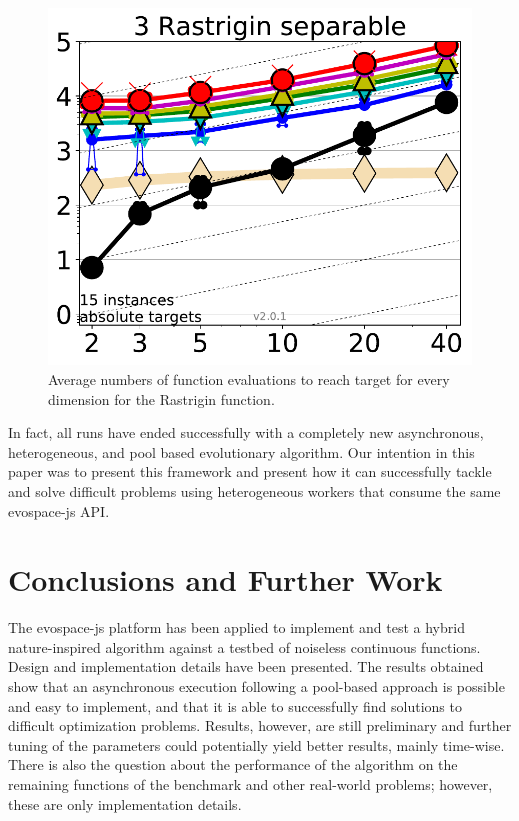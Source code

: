 \begin{figure}[h!tbp]
    \centering
        \includegraphics[width=5in]{img/Rastrigin.pdf}
    \caption{Average numbers of function evaluations to reach target
      for every dimension for the Rastrigin function.}
    \label{fig:rastrigin}
\end{figure}

In fact, all runs have ended successfully with a completely new
asynchronous, heterogeneous, and pool based evolutionary
algorithm. Our intention in this paper was to present this framework
and present how it can successfully tackle and solve difficult
problems using heterogeneous workers that consume the same {\sf
  evospace-js} API. 

\section{Conclusions and Further Work}
\label{sec:conclusions}

The {\sf evospace-js} platform has been applied to implement 
and test a hybrid nature-inspired algorithm against a testbed 
of noiseless continuous functions. Design and implementation 
details have been presented.  The results obtained show that 
an asynchronous execution following a pool-based approach is 
possible and easy to implement, and that it is able to successfully
find solutions to difficult optimization problems. Results, however, are still 
preliminary and further tuning of the parameters could 
potentially yield better results, mainly time-wise. There is also the question about
the performance of the algorithm on the remaining functions
of the benchmark and other real-world problems; however, these are
only implementation details.

